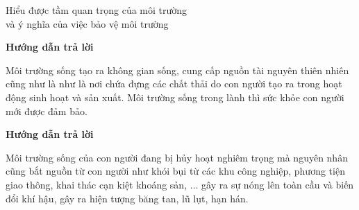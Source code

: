 \begin{dang}{Hiểu được tầm quan trọng của môi trường \\và ý nghĩa của việc bảo vệ môi trường}
	{	\begin{center}
			\textbf{Hướng dẫn trả lời}
		\end{center}
		
		Môi trường sống tạo ra không gian sống, cung cấp nguồn tài nguyên thiên nhiên cũng như là như là nơi chứa đựng các chất thải do con người tạo ra trong hoạt động sinh hoạt và sản xuất. Môi trường sống trong lành thì sức khỏe con người mới được đảm bảo.
		
		
	}
	{	\begin{center}
			\textbf{Hướng dẫn trả lời}
		\end{center}
		
		Môi trường sống của con người đang bị hủy hoạt nghiêm trọng mà nguyên nhân cũng bắt nguồn từ con người như khói bụi từ các khu công nghiệp, phương tiện giao thông, khai thác cạn kiệt khoáng sản, $\ldots$ gây ra sự nóng lên toàn cầu và biến đổi khí hậu, gây ra hiện tượng băng tan, lũ lụt, hạn hán.
	}
\end{dang}
